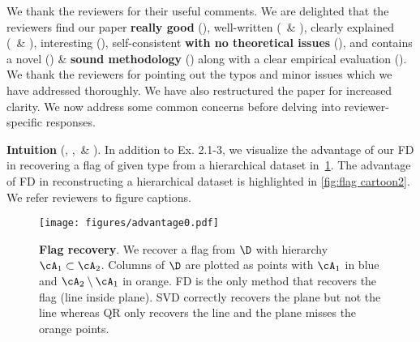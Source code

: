 \documentclass[10pt,twocolumn,letterpaper]{article}
\begin{document}
\maketitle
\thispagestyle{empty}
\appendix

\noindent We thank the reviewers for their useful comments. We are delighted that the reviewers find our paper \textbf{really good} (\Rtwo), well-written (\Rone~\& \Rthree), clearly explained (\Rone~\& \Rthree), interesting (\Rtwo), self-consistent \textbf{with no theoretical issues} (\Rone), and contains a novel (\Rfour) \& \textbf{sound methodology} (\Rtwo) along with a clear empirical evaluation (\Rthree). 
We thank the reviewers for pointing out the typos and minor issues which we have addressed thoroughly.
We have also restructured the paper for increased clarity. 
We now address some common concerns before delving into reviewer-specific responses.

\noindent \textbf{Intuition} (\Rone, \Rtwo,~\& \Rfour). 
In addition to Ex. 2.1-3, we visualize the advantage of our FD in recovering a flag of given type from a hierarchical dataset in~\cref{fig:flag cartoon1}. The advantage of FD in reconstructing a hierarchical dataset is highlighted in \cref{fig:flag cartoon2}. We refer reviewers to figure captions.  
\begin{figure}[ht!]
    \centering
    \vspace{-1mm}
    \texttt{[image: figures/advantage0.pdf]}
    \vspace{-8mm}
    \caption{\footnotesize \textbf{Flag recovery}. We recover a flag from $\D$ with hierarchy $\cA_1 \subset \cA_2$. Columns of $\D$ are plotted as points with $\cA_1$ in blue and $\cA_2 \setminus \cA_1$ in orange. FD is the only method that recovers the flag (line inside plane). SVD correctly recovers the plane but not the line whereas QR only recovers the line and the plane misses the orange points. %
    }
    \vspace{-3mm}
    \label{fig:flag cartoon1}
\end{figure}
\end{document}
